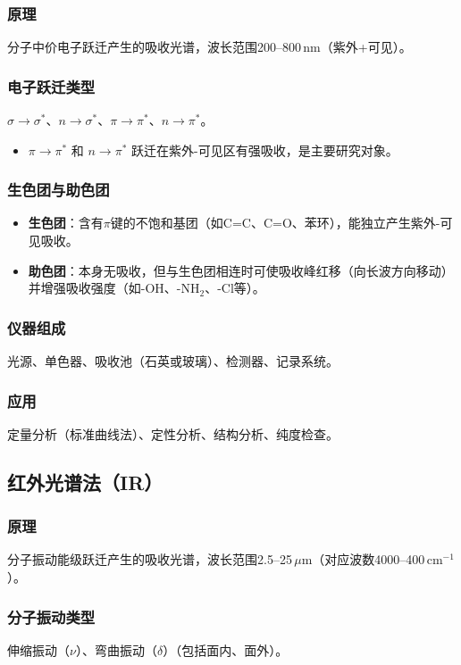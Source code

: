 \documentclass[11pt,a4paper]{article}
\begin{document}
\subsubsection{原理}
分子中价电子跃迁产生的吸收光谱，波长范围200--800\,nm（紫外+可见）。

\subsubsection{电子跃迁类型}
\(\sigma \to \sigma^*\)、\(n \to \sigma^*\)、\(\pi \to \pi^*\)、\(n \to \pi^*\)。
\begin{itemize}
    \item \(\pi \to \pi^*\) 和 \(n \to \pi^*\) 跃迁在紫外-可见区有强吸收，是主要研究对象。
\end{itemize}

\subsubsection{生色团与助色团}
\begin{itemize}
    \item \textbf{生色团}：含有\(\pi\)键的不饱和基团（如C=C、C=O、苯环），能独立产生紫外-可见吸收。
    \item \textbf{助色团}：本身无吸收，但与生色团相连时可使吸收峰红移（向长波方向移动）并增强吸收强度（如-OH、-NH$_2$、-Cl等）。
\end{itemize}

\subsubsection{仪器组成}
光源、单色器、吸收池（石英或玻璃）、检测器、记录系统。

\subsubsection{应用}
定量分析（标准曲线法）、定性分析、结构分析、纯度检查。

\subsection{红外光谱法（IR）}

\subsubsection{原理}
分子振动能级跃迁产生的吸收光谱，波长范围2.5--25\,\(\mu\)m（对应波数4000--400\,cm\(^{-1}\)）。

\subsubsection{分子振动类型}
伸缩振动（\(\nu\)）、弯曲振动（\(\delta\)）（包括面内、面外）。
\end{document}
